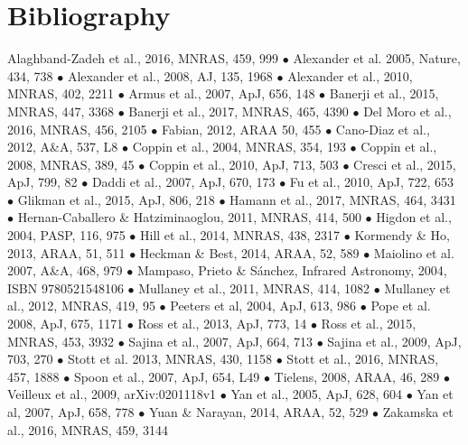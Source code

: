 
\normalsize 
\section*{Bibliography}
\vspace{-8pt}
Alaghband-Zadeh et al., 2016, MNRAS, 459, 999 $\bullet$
Alexander et al. 2005, Nature, 434, 738  $\bullet$
Alexander et al., 2008, AJ, 135, 1968	 $\bullet$
Alexander et al., 2010, MNRAS, 402, 2211 $\bullet$
Armus et al., 2007, ApJ, 656, 148 $\bullet$
Banerji et al., 2015, MNRAS, 447, 3368 $\bullet$
Banerji et al., 2017, MNRAS, 465, 4390 $\bullet$
Del Moro et al., 2016, MNRAS, 456, 2105 $\bullet$
Fabian, 2012, ARAA 50, 455 $\bullet$ 
Cano-Diaz et al., 2012, A\&A, 537, L8 $\bullet$  
Coppin et al., 2004, MNRAS, 354, 193 $\bullet$
Coppin et al., 2008, MNRAS, 389, 45 $\bullet$
Coppin et al., 2010, ApJ, 713, 503 $\bullet$
Cresci et al., 2015, ApJ, 799, 82 $\bullet$
Daddi et al., 2007, ApJ, 670, 173	$\bullet$
Fu et al., 2010, ApJ, 722, 653 	$\bullet$
Glikman et al., 2015, ApJ, 806, 218 $\bullet$
Hamann et al., 2017, MNRAS, 464, 3431 $\bullet$
Hernan-Caballero \& Hatziminaoglou, 2011, MNRAS, 414, 500	$\bullet$
Higdon et al., 2004, PASP, 116, 975 $\bullet$
Hill et al., 2014, MNRAS, 438, 2317 $\bullet$
Kormendy \& Ho, 2013, ARAA, 51, 511 $\bullet$
Heckman \& Best, 2014, ARAA, 52, 589  $\bullet$
Maiolino et al. 2007, A\&A, 468, 979 $\bullet$
Mampaso, Prieto \& Sánchez, Infrared Astronomy, 2004, ISBN  9780521548106 $\bullet$
Mullaney et al., 2011, MNRAS, 414, 1082  $\bullet$
Mullaney et al., 2012, MNRAS, 419, 95 $\bullet$
Peeters et al, 2004, ApJ, 613, 986 $\bullet$
Pope et al. 2008, ApJ, 675, 1171 $\bullet$
Ross et al., 2013, ApJ, 773, 14 $\bullet$
Ross et al., 2015, MNRAS, 453, 3932 $\bullet$
Sajina et al., 2007, ApJ, 664, 713 $\bullet$
Sajina et al., 2009, ApJ, 703, 270 $\bullet$
Stott et al. 2013, MNRAS, 430, 1158 $\bullet$
Stott et al., 2016, MNRAS, 457, 1888 $\bullet$
Spoon et al., 2007, ApJ, 654, L49 $\bullet$
Tielens, 2008, ARAA, 46, 289  $\bullet$
Veilleux et al., 2009, arXiv:0201118v1 $\bullet$
Yan et al., 2005, ApJ, 628, 604 $\bullet$
Yan et al, 2007, ApJ, 658, 778 $\bullet$
Yuan \& Narayan, 2014, ARAA, 52, 529 $\bullet$
Zakamska et al., 2016, MNRAS, 459, 3144 

\normalsize
